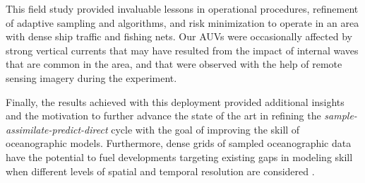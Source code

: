 This field study provided invaluable lessons in operational
procedures, refinement of adaptive sampling and algorithms, and risk
minimization to operate in an area with dense ship traffic and fishing
nets. Our AUVs were occasionally affected by strong vertical currents
that may have resulted from the impact of internal waves that are
common in the area, and that were observed with the help of remote
sensing imagery during the experiment.

Finally, the results achieved with this deployment provided additional
insights and the motivation to further advance the state of the art in
refining the \emph{sample-assimilate-predict-direct} cycle with the
goal of improving the skill of oceanographic models. Furthermore,
dense grids of sampled oceanographic data have the potential to fuel
developments targeting existing gaps in modeling skill when different
levels of spatial and temporal resolution are considered
\parencite{Balaji_2022}.
